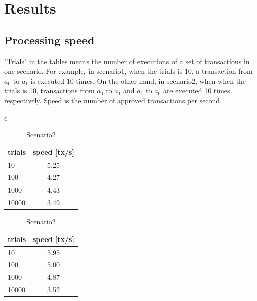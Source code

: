 \documentclass[a4paper, oneside]{discothesis}
\begin{document}
\section{Results}

\subsection{Processing speed}
"Trials" in the tables means the number of executions of a set of transactions in one scenario.
For example, in scenario1, when the trials is 10, a transaction from $a_0$ to $a_1$
is executed 10 times.
On the other hand, in scenario2, when when the trials is 10,
transactions from $a_0$ to $a_1$ and $a_1$ to $a_0$ are executed 10 times respectively.
Speed is the number of approved transactions per second.

\begin{table}[t]
    \begin{center}
        \begin{tabular}{c}

            \begin{minipage}{0.5\hsize}
                \begin{center}
                    \caption{Scenario1}
                    \begin{tabular}{|l|c|} \hline
                        trials & speed [tx/s]\\ \hline \hline
                        10 & 5.25 \\
                        100 & 4.27 \\
                        1000 & 4.43 \\ 
                        10000 & 3.49 \\ \hline
                    \end{tabular}
                \end{center}
            \end{minipage}

            \begin{minipage}{0.5\hsize}
                \begin{center}
                    \caption{Scenario2}
                    \begin{tabular}{|l|c|} \hline
                        trials & speed [tx/s]\\ \hline \hline
                        10 &  5.95 \\
                        100 & 5.00 \\
                        1000 & 4.87 \\
                        10000 & 3.52\\ \hline
                    \end{tabular}
                \end{center}
            \end{minipage}

        \end{tabular}
    \end{center}
\end{table}
\end{document}
